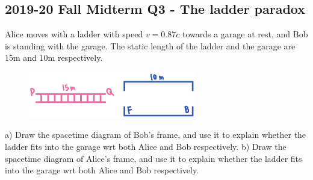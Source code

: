 \documentclass[12pt]{book} %
\numberwithin{equation}{chapter}
\begin{document}
\subsection*{2019-20 Fall Midterm Q3 - The ladder paradox}
\label{The ladder paradox}
Alice moves with a ladder with speed $v=0.87c$ towards a garage at rest, and Bob is standing with the garage. The static length of the ladder and the garage are $15\text{m}$ and $10\text{m}$ respectively. 
\begin{figure}[H]
\centering
\includegraphics[width=0.65\textwidth]{Ladder paradox}
\end{figure}
\noindent a) Draw the spacetime diagram of Bob's frame, and use it to explain whether the ladder fits into the garage wrt both Alice and Bob respectively.\bigskip\newline
b) Draw the spacetime diagram of Alice's frame, and use it to explain whether the ladder fits into the garage wrt both Alice and Bob respectively.
\end{document}
